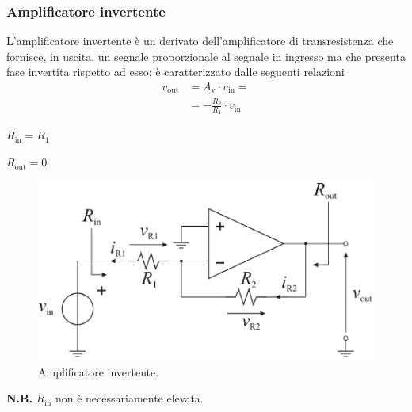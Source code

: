 \documentclass[a4paper]{article}
\begin{document}
			\subsubsection{Amplificatore invertente}
				L'amplificatore invertente è un derivato dell'amplificatore di transresistenza che fornisce, in uscita, un segnale proporzionale al segnale in ingresso ma che presenta fase invertita rispetto ad esso; è caratterizzato dalle seguenti relazioni
				\begin{equation*}
				\begin{split}
					v_{\mathrm{out}} &= A_{\mathrm{v}} \cdot v_{\mathrm{in}} = \\
									 &= -\frac{R_{2}}{R_{1}} \cdot v_{\mathrm{in}}
				\end{split}
				\end{equation*}
				\begin{center}
					$ R_{\mathrm{in}} = R_{1} $
				\end{center}
				\newline
				\begin{center}
					$ R_{\mathrm{out}} = 0 $
				\end{center}
				\newline
				\begin{figure}[h!]
					\centering
					\includegraphics[scale=0.7]{amplificatoreInvertente}
					\caption{Amplificatore invertente.}
					\label{fig:amplificatoreInvertente}
				\end{figure}
				\newline
				\begin{scriptsize}
					\textbf{N.B.} $ R_{\mathrm{in}} $ non è necessariamente elevata. 
				\end{scriptsize}
\end{document}
